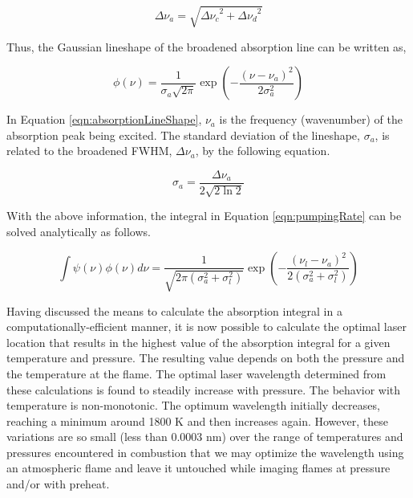 \begin{equation}
  \Delta\nu_a = \sqrt{ { \Delta\nu_c }^2 + { \Delta\nu_d }^2 }
  \label{eqn:broadening}
\end{equation}


Thus, the Gaussian lineshape of the broadened absorption line can be written as,

\begin{equation}
  \phi(\nu) = \frac{1}{\sigma_a\sqrt{2\pi}} \exp{\left(-\dfrac{(\nu-\nu_a)^2}{2\sigma_a^2}\right)}
  \label{eqn:absorptionLineShape}
\end{equation}


In Equation \ref{eqn:absorptionLineShape}, \(\nu_a\) is the frequency (wavenumber) of the absorption peak being excited.
The standard deviation of the lineshape, \(\sigma_a\), is related to the broadened FWHM, \(\Delta\nu_a\), by the following equation.

\begin{equation}
  \sigma_a = \frac{\Delta\nu_a}{2 \sqrt{ 2 \ln{2} } }
\end{equation}

With the above information, the integral in Equation \ref{eqn:pumpingRate} can be solved analytically as follows.

\begin{equation}
  \int \psi(\nu) \phi(\nu) d\nu = \frac{1}{\sqrt{2\pi ( \sigma_a^2 + \sigma_l^2 )}} \exp{\left(-\frac{ (\nu_l - \nu_a )^2 }{2 ( \sigma_a^2 + \sigma_l^2 )}\right)}
  \label{eqn:absorptionIntegral}
\end{equation}

Having discussed the means to calculate the absorption integral in a computationally-efficient manner, it is now possible to calculate the optimal laser location that results in the highest value of the absorption integral for a given temperature and pressure.
The resulting value depends on both the pressure and the temperature at the flame.
The optimal laser wavelength determined from these calculations is found to steadily increase with pressure.
The behavior with temperature is non-monotonic.
The optimum wavelength initially decreases, reaching a minimum around 1800 K and then increases again.
However, these variations are so small (less than 0.0003 nm) over the range of temperatures and pressures encountered in combustion that we may optimize the wavelength using an atmospheric flame and leave it untouched while imaging flames at pressure and/or with preheat.

